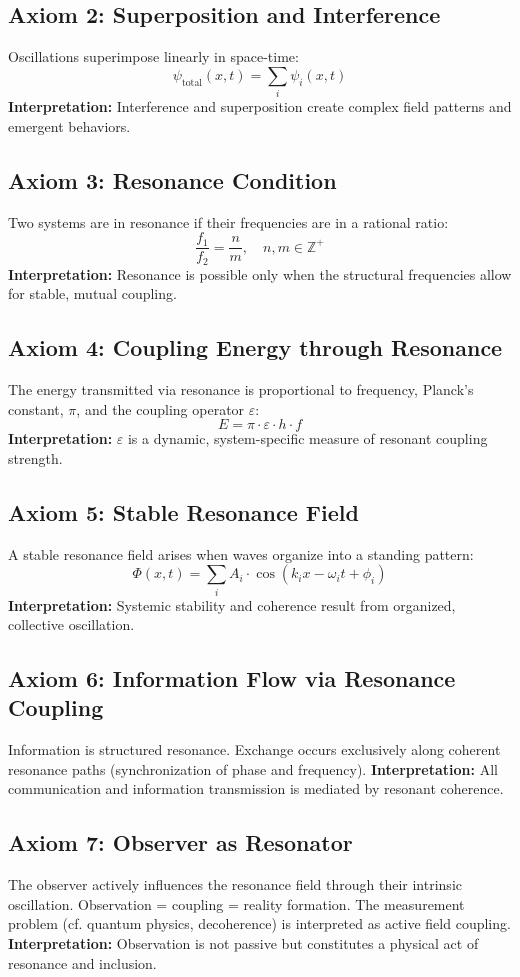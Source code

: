 \documentclass[12pt]{article}
\begin{document}
	\subsection{Axiom 2: Superposition and Interference}
	Oscillations superimpose linearly in space-time:
	\[
	\psi_{\text{total}}(x, t) = \sum_i \psi_i(x, t)
	\]
	\textbf{Interpretation:} Interference and superposition create complex field patterns and emergent behaviors.
	
	\subsection{Axiom 3: Resonance Condition}
	Two systems are in resonance if their frequencies are in a rational ratio:
	\[
	\frac{f_1}{f_2} = \frac{n}{m},\quad n, m \in \mathbb{Z}^+
	\]
	\textbf{Interpretation:} Resonance is possible only when the structural frequencies allow for stable, mutual coupling.
	
	\subsection{Axiom 4: Coupling Energy through Resonance}
	The energy transmitted via resonance is proportional to frequency, Planck's constant, $\pi$, and the coupling operator $\varepsilon$:
	\[
	E = \pi \cdot \varepsilon \cdot h \cdot f
	\]
	\textbf{Interpretation:} $\varepsilon$ is a dynamic, system-specific measure of resonant coupling strength.
	
	\subsection{Axiom 5: Stable Resonance Field}
	A stable resonance field arises when waves organize into a standing pattern:
	\[
	\Phi(x, t) = \sum_{i} A_i \cdot \cos(k_i x - \omega_i t + \phi_i)
	\]
	\textbf{Interpretation:} Systemic stability and coherence result from organized, collective oscillation.
	
	\subsection{Axiom 6: Information Flow via Resonance Coupling}
	Information is structured resonance. Exchange occurs exclusively along coherent resonance paths (synchronization of phase and frequency).
	\textbf{Interpretation:} All communication and information transmission is mediated by resonant coherence.
	
	\subsection{Axiom 7: Observer as Resonator}
	The observer actively influences the resonance field through their intrinsic oscillation. Observation = coupling = reality formation. The measurement problem (cf. quantum physics, decoherence) is interpreted as active field coupling.
	\textbf{Interpretation:} Observation is not passive but constitutes a physical act of resonance and inclusion.
	
\end{document}
